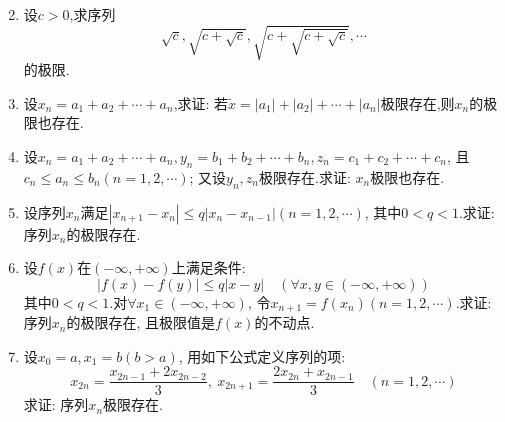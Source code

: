 \begin{enumerate}
$$	$$
	\item 设$c>0$,求序列
	$$
	\sqrt{c}, \sqrt{c+\sqrt{c}},\sqrt{c+\sqrt{c+\sqrt{c}}}, \cdots
	$$
	的极限.
	\item 设$x_n=a_1+a_2+\cdots+a_n$,求证: 若$\tilde{x}=|a_1|+|a_2|+\cdots+|a_n|$极限存在,则${x_n}$的极限也存在.
	\item 设$x_n=a_1+a_2+\cdots+a_n,y_n=b_1+b_2+\cdots+b_n,z_n=c_1+c_2+\cdots+c_n$, 且$c_n\le a_n\le b_n(n=1,2,\cdots)$; 又设${y_n},{z_n}$极限存在.求证: ${x_n}$极限也存在.
	\item 设序列${x_n}$满足$|x_{n+1}-x_n|\le q|x_n-x_{n-1}|(n=1,2,\cdots)$, 其中$0<q<1$.求证:
	序列${x_n}$的极限存在.
	\item 设$f(x)$在$(-\infty,+\infty)$上满足条件:
	$$|f(x)-f(y)|\le q|x-y|\quad (\forall x,y \in (-\infty,+\infty))$$
	其中$0<q<1$.对$\forall x_1\in (-\infty,+\infty)$, 令$x_{n+1}=f(x_n)(n=1,2,\cdots)$.求证: 序列${x_n}$的极限存在, 且极限值是$f(x)$的不动点.
	\item 设$x_0=a,x_1=b(b>a)$, 用如下公式定义序列的项: $$
	x_{2n}=\frac{x_{2n-1}+2x_{2n-2}}{3},\ x_{2n+1}=\frac{2x_{2n}+x_{2n-1}}{3}\quad (n = 1,2,\cdots)$$
	求证: 序列${x_n}$极限存在.
\end{enumerate}
